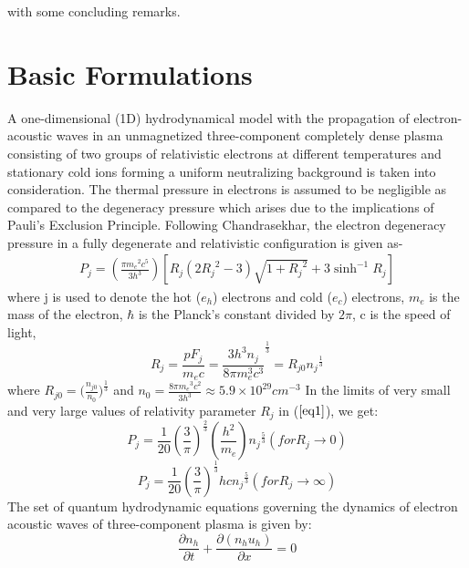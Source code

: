 \documentclass[journal]{IEEEtran}
\begin{document}
with some concluding remarks.

\section{Basic Formulations}\label{II}

A one-dimensional (1D) hydrodynamical model with the propagation of electron-acoustic waves in an unmagnetized three-component completely dense plasma consisting of two groups of relativistic electrons at different temperatures and stationary cold ions forming a uniform neutralizing background is taken into consideration. The thermal pressure in electrons is assumed to be negligible as compared to the degeneracy pressure which arises due to the implications of Pauli’s Exclusion Principle. Following Chandrasekhar, the electron degeneracy pressure in a fully degenerate and relativistic configuration is given as-
\begin{multline}\label{eq1}
P_{j}=\left(\frac{\pi{m_{e}}^{2}{c}^{5}}{3{h}^{3}}\right) [R_j({2R_j}^2-3)\sqrt{1+{R_j}^{2}}+3{\sinh}^{-1} R_j]
\end{multline}
where j is used to denote the hot ($e_h$) electrons and cold ($e_c$) electrons, $m_e$ is the mass of the electron, $\hbar$ is the Planck’s constant divided by $2\pi$, c is the speed of light,
\begin{equation}\label{eq2}
R_j=\frac{pF_j}{m_ec}={\frac{3h^{3}n_j}{8{\pi}m_e^{3}c^{3}}}^{\frac{1}{3}}=R_{j0}{n_j}^{\frac{1}{3}}
\end{equation}
where $R_{j0}={(\frac{n_{j0}}{n_0}})^{\frac{1}{3}}$ and $n_0={\frac{8{\pi}{m_e}^3c^2}{3h^3}}\approx 5.9\times{10^{29}cm^{-3}}$
In the limits of very small and very large values of relativity parameter $R_j$ in ($\ref{eq1}$), we get:
\begin{equation}\label{eq3}
P_j=\frac{1}{20}\left(\frac{3}{\pi}\right)^{\frac{2}{3}}\left(\frac{h^2}{m_e}\right){n_j}^{\frac{5}{3}} (for R_j\rightarrow 0)
\end{equation}
\begin{equation}\label{eq4}
P_j=\frac{1}{20}\left(\frac{3}{\pi}\right)^{\frac{1}{3}}hc{n_j}^{\frac{5}{3}} (for R_j \rightarrow \infty)
\end{equation}
The set of quantum hydrodynamic equations governing the dynamics of electron acoustic waves of three-component plasma is given by:
\begin{equation}\label{eq5}
\frac{\partial n_{h}}{\partial t}+\frac{\partial\left(n_{h} u_{h}\right)}{\partial x}=0
\end{equation}
\end{document}

